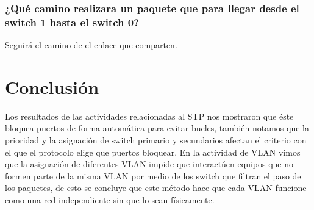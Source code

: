 \documentclass[spanish]{udpreport}
\begin{document}
\subsection{¿Qué camino realizara un paquete que para llegar desde el switch 1 hasta el switch 0?}

Seguirá el camino de el enlace que comparten.

\chapter{Conclusión}
Los resultados de las actividades relacionadas al STP nos mostraron que éste bloquea puertos de forma automática para evitar bucles, también notamos que la prioridad y la asignación de switch primario y secundarios afectan el criterio con el que el protocolo elige que puertos bloquear. En la actividad de VLAN  vimos que la asignación de diferentes VLAN impide que interactúen equipos que no formen parte de la misma VLAN por medio de los switch que filtran el paso de los paquetes, de esto se concluye que este método hace que cada VLAN funcione como una red independiente sin que lo sean físicamente.

\listoffigures
\end{document}
